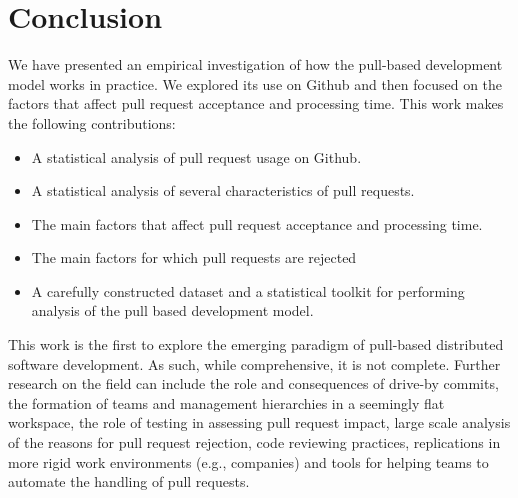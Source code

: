 \documentclass{sig-alternate}
\begin{document}
\section{Conclusion}

We have presented an empirical investigation of how the pull-based development
model works in practice. We explored its use on Github
and then focused on the factors that affect pull request acceptance
and processing time. This work makes the following contributions:

\begin{itemize}

  \item A statistical analysis of pull request usage on Github.

  \item A statistical analysis of several characteristics of pull requests.

  \item The main factors that affect pull request acceptance 
    and processing
    time.%
  

  \item The main factors for which pull requests are rejected

  \item A carefully constructed dataset and a statistical toolkit for
    performing analysis of the pull based development model.

\end{itemize}

This work is the first to explore the emerging paradigm of pull-based
distributed software development. As such, while comprehensive, it is not complete.
Further research on the field can include the role and consequences of drive-by
commits, the formation of teams and management hierarchies in a seemingly flat
workspace, the role of testing in assessing pull request impact, large scale
analysis of the reasons for pull request rejection, code reviewing practices,
replications in more rigid work environments (e.g., companies) and tools for
helping teams to automate the handling of pull requests.
\end{document}
